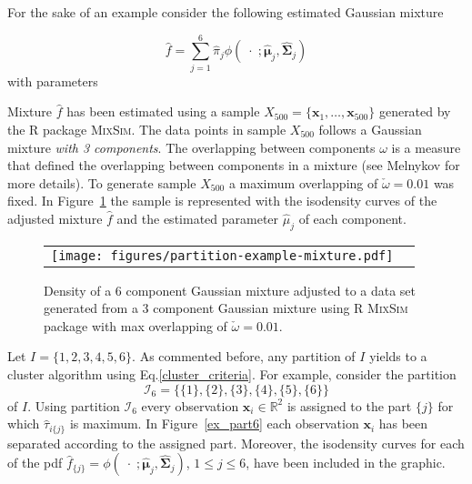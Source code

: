 \documentclass[10pt, a4paper]{article}
\DeclareMathOperator*{\argmax}{arg\,max}
\newcommand{\m}[1]{\boldsymbol{#1}}
\begin{document}
For the sake of an example consider the following estimated Gaussian mixture

\[
\hat{f} = \sum_{j=1}^6 \hat{\pi}_j \phi(\;\cdot\; ; \hat{\m\mu}_j, \hat{\m\Sigma}_j)
\]
with parameters
{\small

}

Mixture $\hat{f}$ has been estimated using a sample $X_{500}=\{\m x_1, \dots, \m x_{500}\}$ generated by the R package \textsc{MixSim}. The data points in sample $X_{500}$ follows a Gaussian mixture \emph{with 3 components}. The overlapping between components $\omega$ is a measure that defined the overlapping between components in a mixture (see Melnykov for more details). To generate sample $X_{500}$ a maximum overlapping of  $\check{\omega} = 0.01$ was fixed. In Figure~\ref{ex_mixture} the sample is represented with the isodensity curves of the adjusted mixture $\hat{f}$ and the estimated parameter $\hat{\mu}_j$ of each component.

\begin{figure}[thbp]
\begin{center}
\begin{tabular}{cc}
  \texttt{[image: figures/partition-example-mixture.pdf]} \\
 \end{tabular}
 \caption{Density of a 6 component Gaussian mixture adjusted to a data set generated from a 3 component Gaussian mixture using R \textsc{MixSim} package with max overlapping of $\check{\omega} = 0.01$.}\label{ex_mixture}
\end{center}
\end{figure}

Let $I = \{1,2,3,4,5,6\}$. As commented before, any partition of $I$ yields to a cluster algorithm using Eq.\ref{cluster_criteria}. For example, consider the partition 
\[\mathcal{I}_6 = \{\{1\},\{2\},\{3\},\{4\},\{5\},\{6\}\}\]
of $I$. Using partition $\mathcal{I}_6$ every observation $\m x_i \in \mathbb{R}^2$ is assigned to the part $\{j\}$ for which $\hat{\tau}_{i\{j\}}$ is maximum. In Figure~\ref{ex_part6} each observation $\m x_i$ has been separated according to the assigned part. Moreover, the isodensity curves for each of the pdf $\hat{f}_{\{j\}} = \phi(\;\cdot\; ; \hat{\m\mu}_j, \hat{\m\Sigma}_j)$, $1\leq j \leq 6$, have been included in the graphic. 

\end{document}
